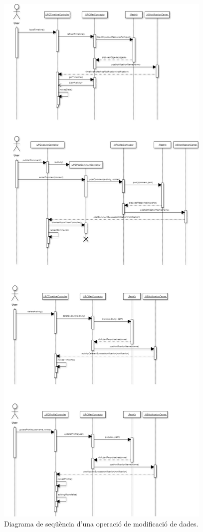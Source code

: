 \begin{figure}[ht]
    \centering
    \includegraphics*[scale=0.6, viewport=0 0 800 570]{Memoria/Arquitectura/Projecte/Domini/model_comportament_arquitectura.png}
    \caption{Diagrama de seqüència d'una operació de modificació de dades.}
    \label{fig:model_comportament_modificacio}
\end{figure}
\FloatBarrier
